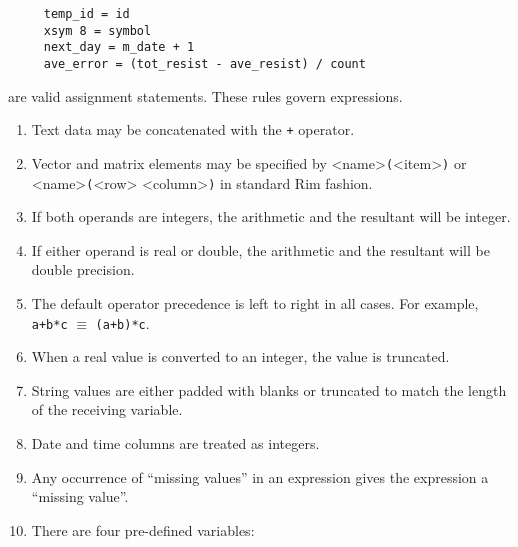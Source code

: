\documentclass[11pt,a4paper]{report}
\begin{document}
\begin{verbatim}
     temp_id = id
     xsym 8 = symbol
     next_day = m_date + 1
     ave_error = (tot_resist - ave_resist) / count
\end{verbatim}
 
are valid assignment statements.  These rules govern
expressions.
 
\begin{enumerate}
\item Text data may be concatenated with the \verb!+! operator.
\item Vector and matrix elements may be specified
   by <name>\verb!(!<item>\verb!)! or <name>\verb!(!<row> <column>\verb!)!
   in standard Rim fashion.
\item If both operands are integers, the arithmetic
   and the resultant will be integer.
\item If either operand is real or double, the arithmetic
   and the resultant will be double precision.
\item The default operator precedence is left to right
   in all cases.  For example,
   \verb!a+b*c! $\equiv$ \verb!(a+b)*c!.
\item When a real value is converted to an integer, the value is truncated.
\item String values are either padded with blanks or truncated
   to match the length of the receiving variable.
\item Date and time columns are treated as integers.
\item Any occurrence of ``missing values'' in an expression
   gives the expression a ``missing value''.
\item There are four pre-defined variables:
\end{enumerate}
 
\end{document}
